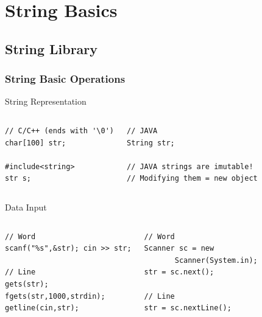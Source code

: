 

\section{String Basics}

\subsection{String Library}

\begin{frame}[fragile]
  \frametitle{String Basic Operations}
  {\smaller
    \begin{block}{String Representation}
      \begin{columns}[T]
\begin{verbatim}
// C/C++ (ends with '\0')
char[100] str;

#include<string>
str s;
\end{verbatim}
\begin{verbatim}
// JAVA
String str;

// JAVA strings are imutable!
// Modifying them = new object
\end{verbatim}
      \end{columns}
    \end{block}

    \begin{block}{Data Input}
      \begin{columns}[T]
\begin{verbatim}
// Word
scanf("%s",&str); cin >> str;

// Line
gets(str);
fgets(str,1000,strdin);
getline(cin,str);
\end{verbatim}
\begin{verbatim}
// Word
Scanner sc = new
       Scanner(System.in);
str = sc.next();

// Line
str = sc.nextLine();
\end{verbatim}
      \end{columns}
    \end{block}
  }
\end{frame}

